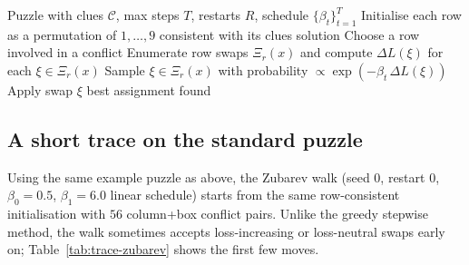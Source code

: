 \documentclass[11pt]{article}
\begin{document}
\begin{algorithm}[t]
\caption{Zubarev walk over row swaps (heuristic)}
\begin{algorithmic}[1]
\Require Puzzle with clues $\mathcal{C}$, max steps $T$, restarts $R$, schedule $\{\beta_t\}_{t=1}^T$
    \State Initialise each row as a permutation of $1,\dots,9$ consistent with its clues
         \State \Return solution \EndIf
        \State Choose a row involved in a conflict
        \State Enumerate row swaps $\Xi_r(x)$ and compute $\Delta L(\xi)$ for each $\xi\in\Xi_r(x)$
        \State Sample $\xi\in\Xi_r(x)$ with probability $\propto \exp(-\beta_t\,\Delta L(\xi))$
        \State Apply swap $\xi$
    \EndFor
\EndFor
\State \Return best assignment found
\end{algorithmic}
\end{algorithm}

\subsection{A short trace on the standard puzzle}
Using the same example puzzle as above, the Zubarev walk (seed $0$, restart $0$, $\beta_0=0.5$, $\beta_1=6.0$ linear schedule) starts from the same row-consistent initialisation with $56$ column+box conflict pairs. Unlike the greedy stepwise method, the walk sometimes accepts loss-increasing or loss-neutral swaps early on; Table~\ref{tab:trace-zubarev} shows the first few moves.

\begin{table}[t]
\centering
{}
\caption{First eight Zubarev-walk swap steps for the example puzzle (seed 0). Rows/columns are 1-indexed.}
\label{tab:trace-zubarev}
\end{table}
\end{document}
